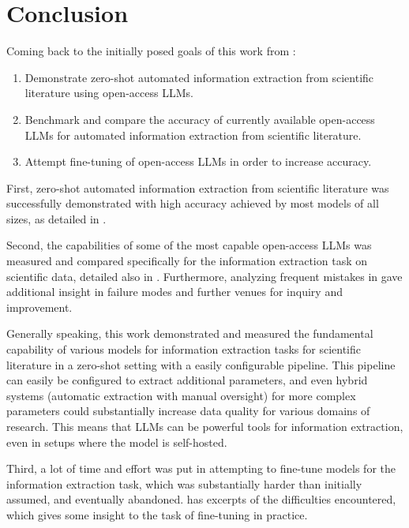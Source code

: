 \chapter{Conclusion}\label{chap:conclusion}

Coming back to the initially posed goals of this work from :

\begin{enumerate}
    \item Demonstrate zero-shot automated information extraction from scientific literature using open-access \glspl{LLM}.
    \item Benchmark and compare the accuracy of currently available open-access \glspl{LLM} for automated information extraction from scientific literature.
    \item Attempt fine-tuning of open-access \glspl{LLM} in order to increase accuracy.
\end{enumerate}

First, zero-shot automated information extraction from scientific literature was successfully demonstrated with high accuracy achieved by most models of all sizes, as detailed in .

Second, the capabilities of some of the most capable open-access \glspl{LLM} was measured and compared specifically for the information extraction task on scientific data, detailed also in .
Furthermore, analyzing frequent mistakes in  gave additional insight in failure modes and further venues for inquiry and improvement.

Generally speaking, this work demonstrated and measured the fundamental capability of various models for information extraction tasks for scientific literature in a zero-shot setting with a easily configurable pipeline.
This pipeline can easily be configured to extract additional parameters, and even hybrid systems (automatic extraction with manual oversight) for more complex parameters could substantially increase data quality for various domains of research.
This means that \glspl{LLM} can be powerful tools for information extraction, even in setups where the model is self-hosted.

Third, a lot of time and effort was put in attempting to fine-tune models for the information extraction task, which was substantially harder than initially assumed, and eventually abandoned.
 has excerpts of the difficulties encountered, which gives some insight to the task of fine-tuning in practice.










